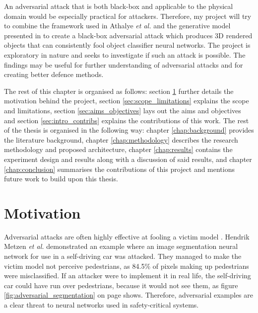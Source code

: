 An adversarial attack that is both black-box and applicable to the physical domain would be especially practical for attackers. Therefore, my project will try to combine the framework used in Athalye \textit{et al.} \cite{athalye} and the generative model presented in \cite{zheng_black_box_GAN} to create a black-box adversarial attack which produces 3D rendered objects that can consistently fool object classifier neural networks. The project is exploratory in nature and seeks to investigate if such an attack is possible. The findings may be useful for further understanding of adversarial attacks and for creating better defence methods.

The rest of this chapter is organised as follows: section \ref{sec:motivation} further details the motivation behind the project, section \ref{sec:scope_limitations} explains the scope and limitations, section \ref{sec:aims_objectives} lays out the aims and objectives and section \ref{sec:intro_contribs} explains the contributions of this work. The rest of the thesis is organised in the following way: chapter \ref{chap:background} provides the literature background, chapter \ref{chap:methodology} describes the research methodology and proposed architecture, chapter \ref{chap:results} contains the experiment design and results along with a discussion of said results, and chapter \ref{chap:conclusion} summarises the contributions of this project and mentions future work to build upon this thesis.

\section{Motivation}
    \label{sec:motivation}
	
Adversarial attacks are often highly effective at fooling a victim model \cite{akhtar, silva_survey, dong2020benchmarking, robustart, fgsm}. Hendrik Metzen \textit{et al.} \cite{Metzen_2017_ICCV} demonstrated an example where an image segmentation neural network for use in a self-driving car was attacked. They managed to make the victim model not perceive pedestrians, as 84.5\% of pixels making up pedestrians were misclassified. If an attacker were to implement it in real life, the self-driving car could have run over pedestrians, because it would not see them, as figure \ref{fig:adversarial_segmentation} on page \pageref{fig:adversarial_segmentation} shows. Therefore, adversarial examples are a clear threat to neural networks used in safety-critical systems.

